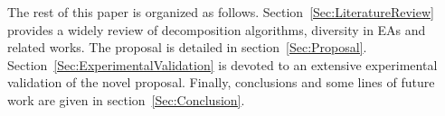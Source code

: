The rest of this paper is organized as follows.
%
Section~\ref{Sec:LiteratureReview} provides a widely review of decomposition algorithms, diversity in EAs and related works.
%
The \VSDMOEAD{} proposal is detailed in section~\ref{Sec:Proposal}.
%
Section~\ref{Sec:ExperimentalValidation} is devoted to an extensive experimental validation of the novel proposal.
%
Finally, conclusions and some lines of future work are given in section~\ref{Sec:Conclusion}.
%
